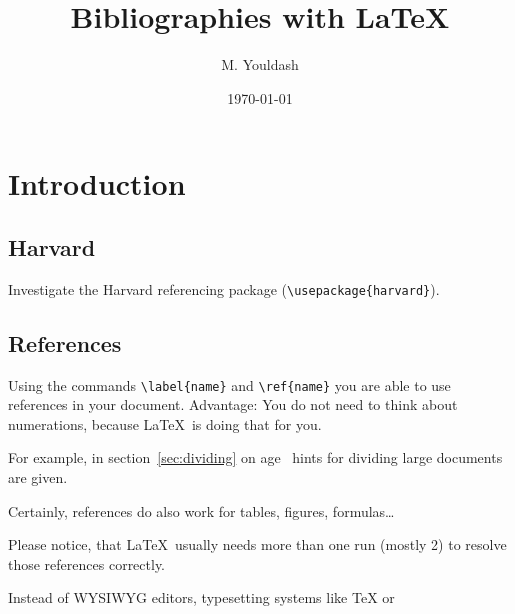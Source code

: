 \documentclass[12pt,a4paper,oneside]{report}
\begin{document}
	\pagestyle{empty} %


	\title{Bibliographies with \LaTeX}
	\author{M. Youldash}
	\date{\today}
	\maketitle

	\tableofcontents %
	\cleardoublepage %

	\pagestyle{plain}

	\chapter{Introduction}
	\label{cha:introduction}



	\section{Harvard}
	\label{sec:harvard}
	Investigate the Harvard referencing package
	(\verb#\usepackage{harvard}#).



	\section{References}
	\label{sec:references}

	Using the commands \verb#\label{name}# and \verb#\ref{name}# you are able
	to use references in your document. Advantage: You do not need to think
	about numerations, because \LaTeX\ is doing that for you.

	For example, in section~\ref{sec:dividing} on
	age~\pageref{sec:dividing} hints for
	dividing large documents are given.

	Certainly, references do also work for tables, figures, formulas\ldots

	Please notice, that \LaTeX\ usually needs more than one run (mostly 2) to
	resolve those references correctly.

	Instead of WYSIWYG editors, typesetting systems like TeX or

\end{document}
